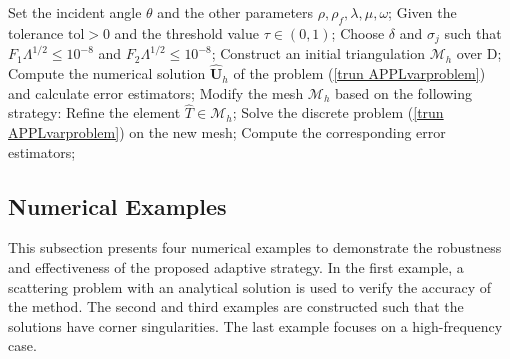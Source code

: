 \documentclass[final,3p,times]{elsarticle}
\begin{document}
\begin{algorithm} 
	\caption{\enskip Adaptive PML-FEM algorithm for  the acoustic-elastic interaction in periodic structures} 
	\label{algorithm}
	\begin{algorithmic}[1]
		\State Set  the incident angle $\theta$ and the other parameters $\rho, \rho_f, \lambda, \mu, \omega$;
		\State Given the tolerance $\mathrm{tol} > 0$ and the threshold value $\tau \in (0,1)$;
		\State Choose $\delta$ and $\sigma_j$ such that $F_1 \Lambda^{1 / 2} \leq 10^{-8}$ and $F_2 \Lambda^{1 / 2} \leq 10^{-8}$;
		\State Construct an initial triangulation $\mathscr{M}_h$ over $\mathrm{D}$;
		\State Compute the numerical solution $\hat{\boldsymbol{U}}_h$ of the problem (\ref{trun APPLvarproblem}) and calculate error estimators;
		\State Modify the mesh $\mathscr{M}_h$ based on the following strategy:
		\State  Refine the element $\hat{T} \in \mathscr{M}_h$;
		\EndIf
		\State  Solve the discrete problem (\ref{trun APPLvarproblem}) on the new mesh;
		\State Compute the corresponding error estimators;
		\EndWhile 
	\end{algorithmic} 
\end{algorithm}
\subsection{Numerical Examples}
This subsection presents four numerical examples to demonstrate the robustness and effectiveness of the proposed adaptive strategy. In the first example, a scattering problem with an analytical solution is used to verify the accuracy of the method. 
The second and third examples are constructed such that the solutions have corner singularities. The last example focuses on a high-frequency case.
\end{document}
